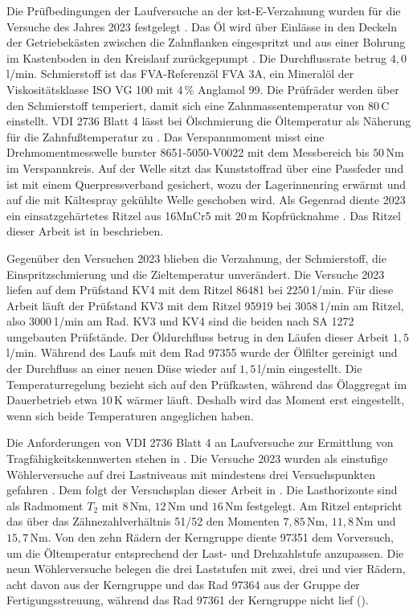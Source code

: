 Die Prüfbedingungen der Laufversuche an der kst-E-Verzahnung wurden für die Versuche des Jahres 2023 festgelegt \cite[S.~39 und 40]{Fie23}. Das Öl wird über Einlässe in den Deckeln der Getriebekästen zwischen die Zahnflanken eingespritzt und aus einer Bohrung im Kastenboden in den Kreislauf zurückgepumpt \cite[S.~10]{Schu09}. Die Durchflussrate betrug $4{,}0$\,l/min. Schmierstoff ist das FVA-Referenzöl FVA 3A, ein Mineralöl der Viskositätsklasse ISO VG 100 mit $4$\,\% Anglamol 99. Die Prüfräder werden über den Schmierstoff temperiert, damit sich eine Zahnmassentemperatur von $80$\,\textdegree C einstellt. VDI 2736 Blatt 4 lässt bei Ölschmierung die Öltemperatur als Näherung für die Zahnfußtemperatur zu \cite[S.~16]{VDI2736-4}. Das Verspannmoment misst eine Drehmomentmesswelle burster 8651-5050-V0022 mit dem Messbereich bis $50$\,Nm im Verspannkreis. Auf der Welle sitzt das Kunststoffrad über eine Passfeder und ist mit einem Querpressverband gesichert, wozu der Lagerinnenring erwärmt und auf die mit Kältespray gekühlte Welle geschoben wird. Als Gegenrad diente 2023 ein einsatzgehärtetes Ritzel aus 16MnCr5 mit $20$\,\textmu m Kopfrücknahme \cite[S.~40]{Fie23}. Das Ritzel dieser Arbeit ist in  beschrieben.

Gegenüber den Versuchen 2023 blieben die Verzahnung, der Schmierstoff, die Einspritzschmierung und die Zieltemperatur unverändert. Die Versuche 2023 liefen auf dem Prüfstand KV4 mit dem Ritzel 86481 bei $2250$\,1/min. Für diese Arbeit läuft der Prüfstand KV3 mit dem Ritzel 95919 bei $3058$\,1/min am Ritzel, also $3000$\,1/min am Rad. KV3 und KV4 sind die beiden nach SA 1272 umgebauten Prüfstände. Der Öldurchfluss betrug in den Läufen dieser Arbeit $1{,}5$\,l/min. Während des Laufs mit dem Rad 97355 wurde der Ölfilter gereinigt und der Durchfluss an einer neuen Düse wieder auf $1{,}5$\,l/min eingestellt. Die Temperaturregelung bezieht sich auf den Prüfkasten, während das Ölaggregat im Dauerbetrieb etwa $10$\,K wärmer läuft. Deshalb wird das Moment erst eingestellt, wenn sich beide Temperaturen angeglichen haben.

Die Anforderungen von VDI 2736 Blatt 4 an Laufversuche zur Ermittlung von Tragfähigkeitskennwerten stehen in . Die Versuche 2023 wurden als einstufige Wöhlerversuche auf drei Lastniveaus mit mindestens drei Versuchspunkten gefahren \cite[S.~65]{Fie23}. Dem folgt der Versuchsplan dieser Arbeit in . Die Lasthorizonte sind als Radmoment $T_{\mathrm{2}}$ mit $8$\,Nm, $12$\,Nm und $16$\,Nm festgelegt. Am Ritzel entspricht das über das Zähnezahlverhältnis 51/52 den Momenten $7{,}85$\,Nm, $11{,}8$\,Nm und $15{,}7$\,Nm. Von den zehn Rädern der Kerngruppe diente 97351 dem Vorversuch, um die Öltemperatur entsprechend der Last- und Drehzahlstufe anzupassen. Die neun Wöhlerversuche belegen die drei Laststufen mit zwei, drei und vier Rädern, acht davon aus der Kerngruppe und das Rad 97364 aus der Gruppe der Fertigungsstreuung, während das Rad 97361 der Kerngruppe nicht lief ().

